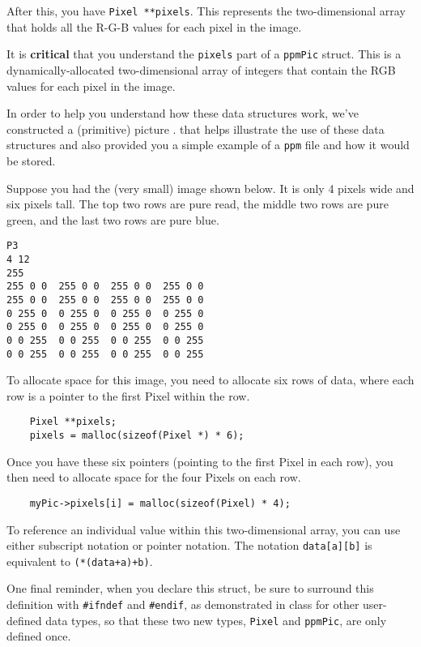 \documentclass[12pt]{article}
\begin{document}
After this, you have {\tt Pixel **pixels}.  This represents the two-dimensional
array that holds all the R-G-B values for each pixel in the image.

It is {\bf critical} that you understand the {\tt pixels} part of a
{\tt ppmPic} struct.  This is a dynamically-allocated two-dimensional
array of integers that contain the RGB values for each pixel in the image.

In order to help you understand how these data structures work, we've
constructed a (primitive) picture
.
that helps illustrate the use of these
data structures and also provided you a simple example of a {\tt ppm} file
and how it would be stored.

Suppose you had the (very small) image shown below.  It is only 4 pixels wide
and six pixels tall. The top two rows are pure read, the middle two rows
are pure green, and the last two rows are pure blue.

\begin{verbatim}
P3
4 12
255
255 0 0  255 0 0  255 0 0  255 0 0
255 0 0  255 0 0  255 0 0  255 0 0
0 255 0  0 255 0  0 255 0  0 255 0 
0 255 0  0 255 0  0 255 0  0 255 0 
0 0 255  0 0 255  0 0 255  0 0 255
0 0 255  0 0 255  0 0 255  0 0 255
\end{verbatim}

To allocate space for this image, you need to allocate six rows of data,
where each row is a pointer to the first Pixel within the row.

\begin{verbatim}
    Pixel **pixels;
    pixels = malloc(sizeof(Pixel *) * 6);
\end{verbatim}

Once you have these six pointers (pointing to the first Pixel in each
row), you then need to allocate space for the four Pixels on each row.

\begin{verbatim}
    myPic->pixels[i] = malloc(sizeof(Pixel) * 4);
\end{verbatim}

To reference an individual value within this two-dimensional array,
you can use either subscript notation or pointer notation.  The
notation {\tt data[a][b]} is equivalent to {\tt *(*(data+a)+b)}.

One final reminder, when you declare this struct,
be sure to surround this definition with {\tt \#ifndef} and {\tt \#endif},
as demonstrated in class for other user-defined data types, so that these
two new types, {\tt Pixel} and {\tt ppmPic}, are only defined once.
\end{document}
